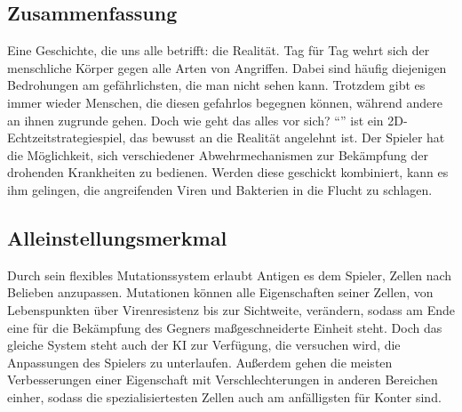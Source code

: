 \subsection{Zusammenfassung}

Eine Geschichte, die uns alle betrifft: die Realität. Tag für Tag wehrt sich der
menschliche Körper gegen alle Arten von Angriffen. Dabei sind häufig diejenigen
Bedrohungen am gefährlichsten, die man nicht sehen kann. Trotzdem gibt
es immer wieder Menschen, die diesen gefahrlos begegnen können, während andere
an ihnen zugrunde gehen. Doch wie geht das alles vor sich? \enquote{\name} ist ein
2D-Echtzeitstrategiespiel, das bewusst an die Realität angelehnt ist. Der
Spieler hat die Möglichkeit, sich verschiedener Abwehrmechanismen zur Bekämpfung
der drohenden Krankheiten zu bedienen. Werden diese geschickt kombiniert, kann
es ihm gelingen, die angreifenden Viren und Bakterien in die Flucht zu
schlagen.

\subsection{Alleinstellungsmerkmal}

Durch sein flexibles Mutationssystem erlaubt Antigen es dem Spieler, Zellen
nach Belieben anzupassen. Mutationen können alle Eigenschaften seiner Zellen,
von Lebenspunkten über Virenresistenz bis zur Sichtweite, verändern, sodass am
Ende eine für die Bekämpfung des Gegners maßgeschneiderte Einheit steht. Doch
das gleiche System steht auch der KI zur Verfügung, die versuchen wird, die
Anpassungen des Spielers zu unterlaufen. Außerdem gehen die meisten
Verbesserungen einer Eigenschaft mit Verschlechterungen in anderen Bereichen
einher, sodass die spezialisiertesten Zellen auch am anfälligsten für Konter
sind.
